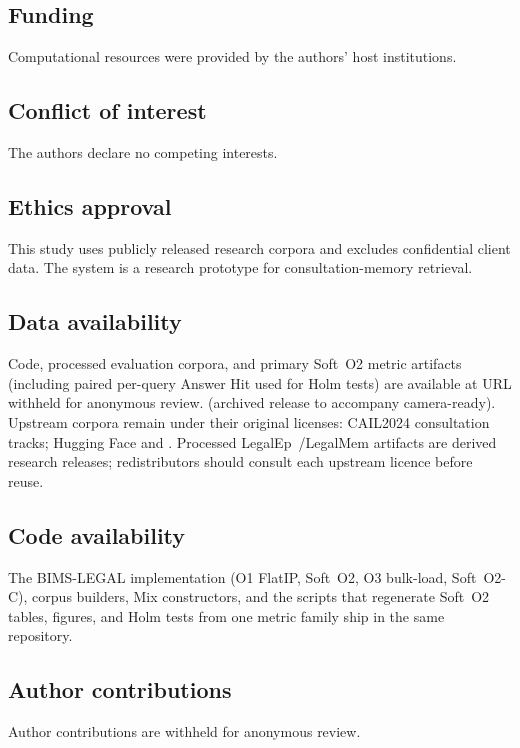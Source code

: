 \documentclass[preprint,12pt,authoryear]{elsarticle}
\begin{document}
\subsection*{Funding}
Computational resources were provided by the authors' host institutions.

\subsection*{Conflict of interest}
The authors declare no competing interests.

\subsection*{Ethics approval}
This study uses publicly released research corpora and excludes confidential client data. The system is a research prototype for consultation-memory retrieval.

\subsection*{Data availability}
Code, processed evaluation corpora, and primary Soft~O2 metric artifacts (including paired per-query Answer Hit used for Holm tests) are available at
URL withheld for anonymous review.
(archived release to accompany camera-ready).
Upstream corpora remain under their original licenses: CAIL2024 consultation tracks; Hugging Face
 and
.
Processed LegalEp~/LegalMem artifacts are derived research releases; redistributors should consult each upstream licence before reuse.

\subsection*{Code availability}
The BIMS-LEGAL implementation (O1 FlatIP, Soft~O2, O3 bulk-load, Soft~O2-C), corpus builders, Mix constructors, and the scripts that regenerate Soft~O2 tables, figures, and Holm tests from one metric family ship in the same repository.

\subsection*{Author contributions}
Author contributions are withheld for anonymous review.

\FloatBarrier


\end{document}
